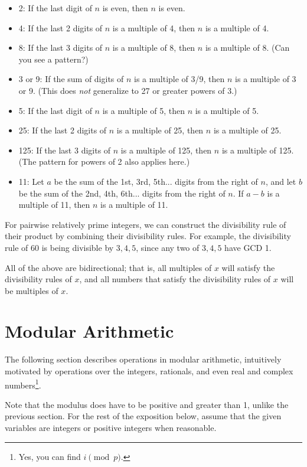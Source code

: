 \documentclass[mast]{lucky}
\begin{document}
\begin{fact}
\hfill
\begin{itemize}
    \item 2: If the last digit of $n$ is even, then $n$ is even.
    \item 4: If the last 2 digits of $n$ is a multiple of 4, then $n$ is a multiple of 4.
    \item 8: If the last 3 digits of $n$ is a multiple of 8, then $n$ is a multiple of 8. (Can you see a pattern?)
    \item 3 or 9: If the sum of digits of $n$ is a multiple of 3/9, then $n$ is a multiple of 3 or 9. (This does \emph{not} generalize to 27 or greater powers of 3.)
    \item 5: If the last digit of $n$ is a multiple of 5, then $n$ is a multiple of 5.
    \item 25: If the last 2 digits of $n$ is a multiple of 25, then $n$ is a multiple of 25.
    \item 125: If the last 3 digits of $n$ is a multiple of 125, then $n$ is a multiple of 125. (The pattern for powers of 2 also applies here.)
    \item 11: Let $a$ be the sum of the 1st, 3rd, 5th... digits from the right of $n$, and let $b$ be the sum of the 2nd, 4th, 6th... digits from the right of $n$. If $a-b$ is a multiple of 11, then $n$ is a multiple of 11.
\end{itemize}
For pairwise relatively prime integers, we can construct the divisibility rule of their product by combining their divisibility rules. For example, the divisibility rule of $60$ is being divisible by $3,4,5$, since any two of $3,4,5$ have GCD 1. 
\end{fact}

All of the above are bidirectional; that is, all multiples of $x$ will satisfy the divisibility rules of $x$, and all numbers that satisfy the divisibility rules of $x$ will be multiples of $x$.

\section{Modular Arithmetic}
The following section describes operations in modular arithmetic, intuitively motivated by operations over the integers, rationals, and even real and complex numbers\footnote{Yes, you can find $i \pmod{p}$.}. 

Note that the modulus does have to be positive and greater than 1, unlike the previous section. For the rest of the exposition below, assume that the given variables are integers or positive integers when reasonable.
\end{document}
